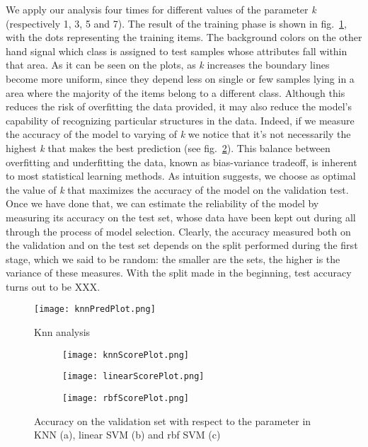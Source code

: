 \documentclass[11pt,twoside,a4paper]{article}
\begin{document}
We apply our analysis four times for different values of the parameter \emph{k} (respectively 1, 3, 5 and 7). The result of the training phase is shown in fig.~\ref{fig:knnPred}, with the dots representing the training items. The background colors on the other hand signal which class is assigned to test samples whose attributes fall within that area. As it can be seen on the plots, as \emph{k} increases the boundary lines become more uniform, since they depend less on single or few samples lying in a area where the majority of the items belong to a different class. Although this reduces the risk of overfitting the data provided, it may also reduce the model's capability of recognizing particular structures in the data.
Indeed, if we measure the accuracy of the model to varying of \emph{k} we notice that it's not necessarily the highest \emph{k} that makes the best prediction (see fig.~\ref{fig:knnScore}). This balance between overfitting and underfitting the data, known as bias-variance tradeoff, is inherent to most statistical learning methods.\newline
As intuition suggests, we choose as optimal the value of \emph{k} that maximizes the accuracy of the model on the validation test. Once we have done that, we can estimate the reliability of the model by measuring its accuracy on the test set, whose data have been kept out during all through the process of model selection. Clearly, the accuracy measured both on the validation and on the test set depends on the split performed during the first stage, which we said to be random: the smaller are the sets, the higher is the variance of these measures. With the split made in the beginning, test accuracy turns out to be XXX.

\begin{figure}[]
  \begin{center}
  \texttt{[image: knnPredPlot.png]}
  \caption{Knn analysis}
  \label{fig:knnPred}
  \end{center}
\end{figure}

\begin{figure}[]
    \centering
    \begin{subfigure}{0.7\textwidth}
	\texttt{[image: knnScorePlot.png]}
        \caption{}
        \label{fig:knnScore}
    \end{subfigure}
    \begin{subfigure}{0.7\textwidth}
	\texttt{[image: linearScorePlot.png]}
        \caption{}
        \label{fig:linearScore}
    \end{subfigure}
    \begin{subfigure}{0.7\textwidth}
        \texttt{[image: rbfScorePlot.png]}
        \caption{}
        \label{fig:rbfScore}
    \end{subfigure}%
    \caption{Accuracy on the validation set with respect to the parameter in KNN (a), linear SVM (b) and rbf SVM (c)}
\end{figure}
\end{document}
